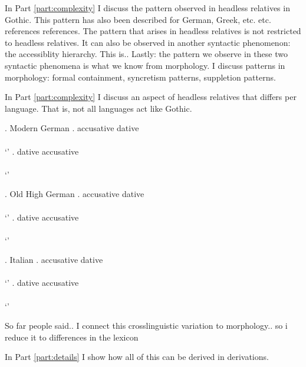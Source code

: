 In Part \ref{part:complexity} I discuss the pattern observed in headless relatives in Gothic. This pattern has also been described for German, Greek, etc. etc. references references.
The pattern that arises in headless relatives is not restricted to headless relatives. It can also be observed in another syntactic phenomenon: the accessiblity hierarchy. This is..
Lastly: the pattern we observe in these two syntactic phenomena is what we know from morphology. I discuss patterns in morphology: formal containment, syncretism patterns, suppletion patterns.

In Part \ref{part:complexity} I discuss an aspect of headless relatives that differs per language. That is, not all languages act like Gothic.

\ex. Modern German
\ag. accusative dative\\
 \\
 `'
\bg. dative accusative\\
 \\
 `'

 \ex. Old High German
 \ag. accusative dative\\
  \\
  `'
 \bg. dative accusative\\
  \\
  `'

  \ex. Italian
  \ag. accusative dative\\
   \\
   `'
  \bg. dative accusative\\
   \\
   `'

So far people said..
I connect this crosslinguistic variation to morphology.. so i reduce it to differences in the lexicon

In Part \ref{part:details} I show how all of this can be derived in derivations.

